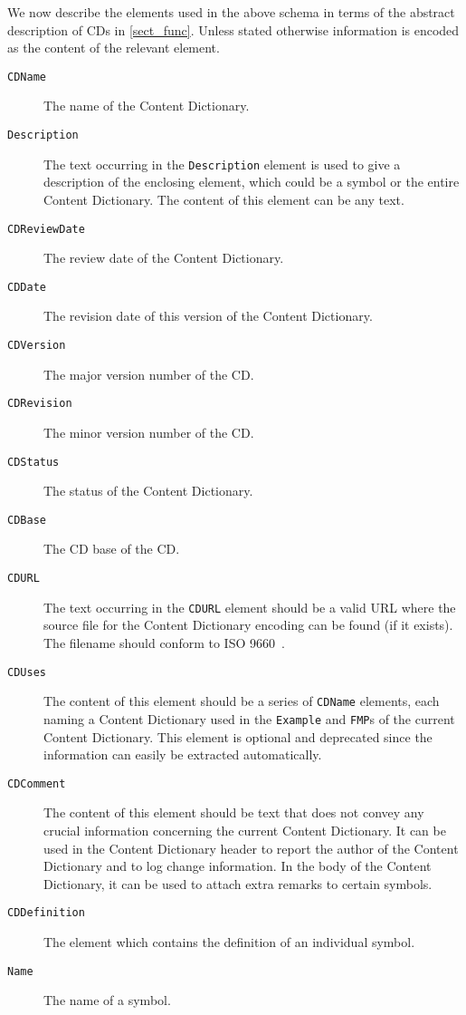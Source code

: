 We now describe the elements used in the above schema in terms of the abstract description
of CDs in \ref{sect_func}.  Unless stated otherwise information is encoded as the content
of the relevant element.

\begin{description}
\item[\lstinline|CDName|] The name of the Content Dictionary.
\item[\lstinline|Description|] The text occurring in the \lstinline|Description| element
  is used to give a description of the enclosing element, which could be a symbol or the
  entire Content Dictionary. The content of this element can be any \XML text.
\item[\lstinline|CDReviewDate|] The review date of the Content Dictionary.
\item[\lstinline|CDDate|] The revision date of this version of the Content Dictionary.
\item[\lstinline|CDVersion|] The major version number of the CD.
\item[\lstinline|CDRevision|] The minor version number of the CD.
\item[\lstinline|CDStatus|] The status of the Content Dictionary.
\item[\lstinline|CDBase|] The CD base of the CD.
\item[\lstinline|CDURL|] The text occurring in the \lstinline|CDURL| element should be a
  valid URL where the source file for the Content Dictionary encoding can be found (if it
  exists). The filename should conform to ISO 9660~\cite{iso9660}.
\item[\lstinline|CDUses|] The content of this element should be a series of
  \lstinline|CDName| elements, each naming a Content Dictionary used in the
  \lstinline|Example| and \lstinline|FMP|s of the current Content Dictionary. This
  element is optional and deprecated since the information can easily be extracted
  automatically.
\item[\lstinline|CDComment|] The content of this element should be text that does not
  convey any crucial information concerning the current Content Dictionary. It can be used
  in the Content Dictionary header to report the author of the Content Dictionary and to
  log change information. In the body of the Content Dictionary, it can be used to attach
  extra remarks to certain symbols.
\item[\lstinline|CDDefinition|] The element which contains the definition of an
  individual symbol.
\item[\lstinline|Name|]The name of a symbol.

\end{description}
